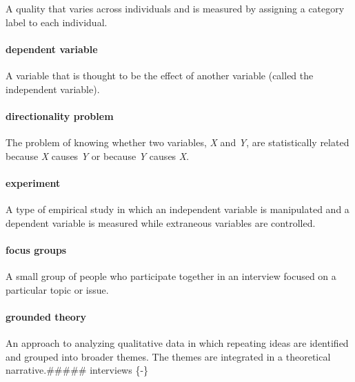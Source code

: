 \documentclass[
]{krantz}
\begin{document}
A quality that varies across individuals and is measured by assigning a category label to each individual.

\hypertarget{dependent-variable}{%
\paragraph*{dependent variable}\label{dependent-variable}}

A variable that is thought to be the effect of another variable (called the independent variable).

\hypertarget{directionality-problem}{%
\paragraph*{directionality problem}\label{directionality-problem}}

The problem of knowing whether two variables, \emph{X} and \emph{Y}, are statistically related because \emph{X} causes \emph{Y} or because \emph{Y} causes \emph{X}.

\hypertarget{experiment}{%
\paragraph*{experiment}\label{experiment}}

A type of empirical study in which an independent variable is manipulated and a dependent variable is measured while extraneous variables are controlled.

\hypertarget{focus-groups}{%
\paragraph*{focus groups}\label{focus-groups}}

A small group of people who participate together in an interview focused on a particular topic or issue.

\hypertarget{grounded-theory}{%
\paragraph*{grounded theory}\label{grounded-theory}}

An approach to analyzing qualitative data in which repeating ideas are identified and grouped into broader themes. The themes are integrated in a theoretical narrative.\#\#\#\#\# interviews \{-\}
\end{document}

